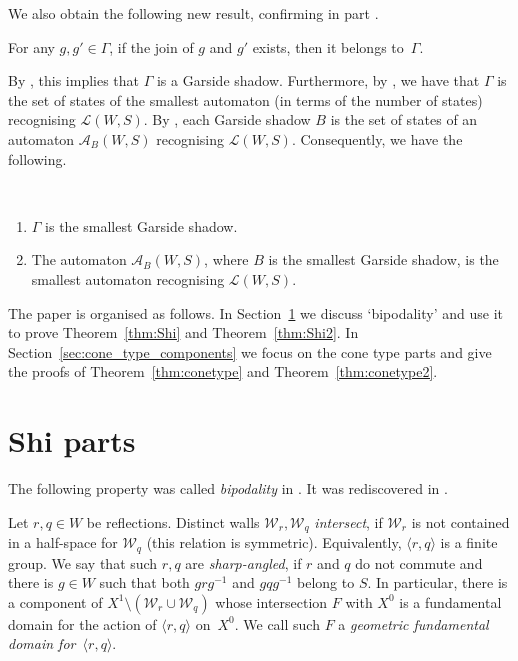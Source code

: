 \documentclass[Unicode,ALCO]{cedram}
\newcommand{\W}{\mathcal{W}}
\begin{document}
We also obtain the following new result, confirming in part {\cite[Conj.~1]{Parkinson-Yau_2022}}.

\begin{thm} 
	\label{thm:conetype2}
	For any $g,g'\in \Gamma$, if the join of $g$ and $g'$ exists, then it belongs to~$\Gamma$. 
\end{thm}

By \cite[Prop~4.27(i)]{Parkinson-Yau_2022}, this implies that $\Gamma$ is a Garside shadow. Furthermore, by \cite[Cor.~4]{Parkinson-Yau_2022}, we have that $\Gamma$ is the set of states of the smallest automaton (in terms of the number of states) recognising $\mathcal{L}(W,S)$. By \cite[Thm.~1.2]{HNW}, each Garside shadow $B$ is the set of states of an automaton $\mathcal A_B(W,S)$ recognising $\mathcal{L}(W,S)$. Consequently, we have the following.

\begin{coro} \,
	\begin{enumerate}[label=\roman*)]
		\item $\Gamma$ is the smallest Garside shadow.
		\item The automaton $\mathcal A_B(W,S)$, where $B$ is the smallest Garside shadow, is 
		the smallest automaton recognising $\mathcal{L}(W,S)$.
	\end{enumerate}
\end{coro}


The paper is organised as follows. In Section~\ref{sec:shi_components} we discuss `bipodality' and use it to prove Theorem~\ref{thm:Shi} and Theorem~\ref{thm:Shi2}. In Section~\ref{sec:cone_type_components} we focus on the cone type parts and give the proofs of Theorem~\ref{thm:conetype} and Theorem~\ref{thm:conetype2}.

\section{Shi parts}
\label{sec:shi_components}

The following property was called \emph{bipodality} in \cite{DH}. It was rediscovered in \cite{OP}.

\begin{defi} Let $r,q\in W$ be reflections. Distinct walls $\W_r,\W_{q}$ \emph{intersect}, if $\W_r$ is not contained in a half-space
	for $\W_{q}$ (this relation is symmetric). Equivalently, $\langle r,q\rangle$ is a finite group. We say that such $r,q$ are
	\emph{sharp-angled}, if $r$ and $q$ do not commute and there is $g\in W$ such that both $grg^{-1}$ and $gqg^{-1}$ belong to $S$. In particular, there is a component of $X^1\setminus (\W_r\cup
	\W_q)$ whose intersection $F$ with $X^0$ is a fundamental domain for the action of $\langle r,q\rangle$ on~$X^0$. We call such $F$ a \emph{geometric fundamental domain for~$\langle r,q\rangle$}.
\end{defi}
\end{document}
